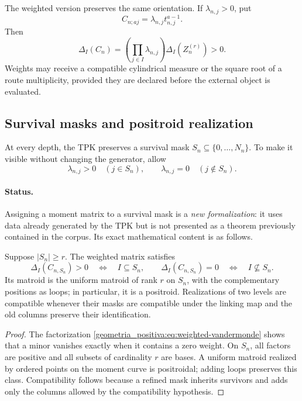 The weighted version preserves the same orientation. If \(\lambda_{n,j}>0\), put
\[
 C_{n;aj}=\lambda_{n,j}t_{n,j}^{a-1}.
\]
Then
\begin{equation}
 \Delta_I(C_n)=\left(\prod_{j\in I}\lambda_{n,j}\right)
 \Delta_I(Z_n^{(r)})>0.
 \label{geometria_positiva:eq:weighted-vandermonde}
\end{equation}
Weights may receive a compatible cylindrical measure or the square root of a route multiplicity, provided they are declared before the external object is evaluated.

\subsection{Survival masks and positroid realization}

At every depth, the TPK preserves a survival mask \(S_n\subseteq\{0,\ldots,N_n\}\). To make it visible without changing the generator, allow
\[
 \lambda_{n,j}>0\quad(j\in S_n),\qquad
 \lambda_{n,j}=0\quad(j\notin S_n).
\]

\paragraph{Status.}
Assigning a moment matrix to a survival mask is a \emph{new formalization}: it uses data already generated by the TPK but is not presented as a theorem previously contained in the corpus. Its exact mathematical content is as follows.

\begin{proposition}
\label{geometria_positiva:thm:tpk-positroid-cell} Suppose \(|S_n|\ge r\). The weighted matrix satisfies
\[
 \Delta_I(C_{n,S_n})>0\quad\Longleftrightarrow\quad I\subseteq S_n,
 \qquad
 \Delta_I(C_{n,S_n})=0\quad\Longleftrightarrow\quad I\not\subseteq S_n.
\]
Its matroid is the uniform matroid of rank \(r\) on \(S_n\), with the complementary positions as loops; in particular, it is a positroid. Realizations of two levels are compatible whenever their masks are compatible under the linking map and the old columns preserve their identification.
\end{proposition}
\begin{proof}
The factorization \eqref{geometria_positiva:eq:weighted-vandermonde} shows that a minor vanishes exactly when it contains a zero weight. On \(S_n\), all factors are positive and all subsets of cardinality \(r\) are bases. A uniform matroid realized by ordered points on the moment curve is positroidal; adding loops preserves this class. Compatibility follows because a refined mask inherits survivors and adds only the columns allowed by the compatibility hypothesis.
\end{proof}

